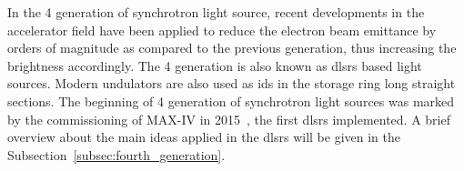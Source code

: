 In the 4 generation of synchrotron light source, recent developments in the accelerator field have been applied to reduce the electron beam emittance by orders of magnitude as compared to the previous generation, thus increasing the brightness accordingly. The 4 generation is also known as \glspl{dlsr} based light sources. Modern undulators are also used as \glspl{id} in the storage ring long straight sections. The beginning of 4 generation of synchrotron light sources was marked by the commissioning of MAX-IV in 2015~\cite{eriksson2016}, the first \glspl{dlsr} implemented. A brief overview about the main ideas applied in the \glspl{dlsr} will be given in the Subsection~\ref{subsec:fourth_generation}.
